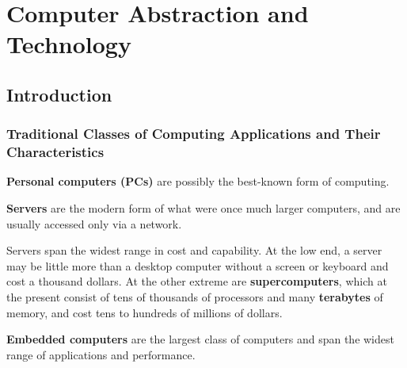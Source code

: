 \documentclass[a4paper,12pt,twoside,openany]{book}
\begin{document}

\restoregeometry
\thispagestyle{empty}
\setcounter{page}{0}
\tableofcontents
\thispagestyle{empty}
\setcounter{page}{0}


\chapter{Computer Abstraction and Technology}
\section{Introduction}
\subsection{Traditional Classes of Computing Applications and Their Characteristics}

\textbf{Personal computers (PCs)} are possibly the best-known form of computing.

\textbf{Servers} are the modern form of what were once much larger computers, and are usually accessed only via a network.

Servers span the widest range in cost and capability. At the low end, a server may be little more than a desktop computer without a screen or keyboard and cost a thousand dollars. At the other extreme are \textbf{supercomputers}, which at the present consist of tens of thousands of processors and many \textbf{terabytes} of memory, and cost tens to hundreds of millions of dollars.


\textbf{Embedded computers} are the largest class of computers and span the widest range of applications and performance.

\end{document}
